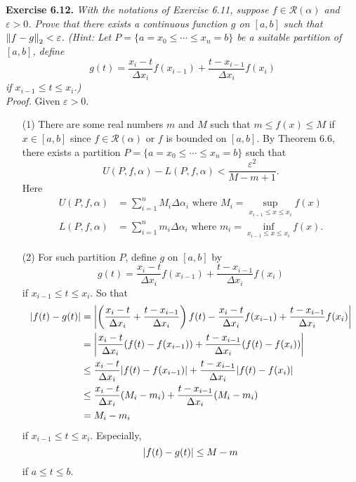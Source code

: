 \documentclass{article}
\begin{document}



\textbf{Exercise 6.12.}
\emph{With the notations of Exercise 6.11,
suppose $f \in \mathscr{R}(\alpha)$ and $\varepsilon > 0$.
Prove that there exists a continuous function $g$ on $[a,b]$
such that $\norm{f-g}_2 < \varepsilon$.
(Hint: Let $P = \{a=x_0 \leq \cdots \leq x_n = b\}$ be a suitable partition of $[a,b]$,
define
\[
  g(t) = \frac{x_i-t}{\Delta x_i} f(x_{i-1}) + \frac{t-x_{i-1}}{\Delta x_i} f(x_i)
\]
if $x_{i-1} \leq t \leq x_i$.)} \\

\emph{Proof.}
Given $\varepsilon > 0$.
\begin{enumerate}
\item[(1)]
There are some real numbers $m$ and $M$
such that $m \leq f(x) \leq M$ if $x \in [a,b]$ since $f \in \mathscr{R}(\alpha)$
or $f$ is bounded on $[a,b]$.
By Theorem 6.6, there exists a partition
$P = \{a=x_0 \leq \cdots \leq x_n = b\}$ such that
\[
  U(P,f,\alpha) - L(P,f,\alpha) < \frac{\varepsilon^2}{M - m + 1}.
\]
Here
\begin{align*}
  U(P,f,\alpha) &= \sum_{i=1}^n M_i \Delta \alpha_i
    \text{ where } M_i = \sup_{x_{i-1} \leq x \leq x_i} f(x) \\
  L(P,f,\alpha) &= \sum_{i=1}^n m_i \Delta \alpha_i
    \text{ where } m_i = \inf_{x_{i-1} \leq x \leq x_i} f(x).
\end{align*}

\item[(2)]
For such partition $P$, define $g$ on $[a,b]$ by
\[
  g(t) = \frac{x_i-t}{\Delta x_i} f(x_{i-1}) + \frac{t-x_{i-1}}{\Delta x_i} f(x_i)
\]
if $x_{i-1} \leq t \leq x_i$.
So that
\begin{align*}
  \abs{ f(t) - g(t) }
  &= \abs{ \left( \frac{x_i-t}{\Delta x_i} + \frac{t-x_{i-1}}{\Delta x_i} \right) f(t)
    - \frac{x_i-t}{\Delta x_i} f(x_{i-1}) + \frac{t-x_{i-1}}{\Delta x_i} f(x_i) } \\
  &= \abs{ \frac{x_i-t}{\Delta x_i}(f(t) - f(x_{i-1}))
    +  \frac{t-x_{i-1}}{\Delta x_i}(f(t) - f(x_i)) } \\
  &\leq \frac{x_i-t}{\Delta x_i}\abs{ f(t) - f(x_{i-1}) }
    +  \frac{t-x_{i-1}}{\Delta x_i}\abs{ f(t) - f(x_i) } \\
  &\leq \frac{x_i-t}{\Delta x_i} (M_i - m_i) + \frac{t-x_{i-1}}{\Delta x_i}(M_i - m_i) \\
  &= M_i - m_i
\end{align*}
if $x_{i-1} \leq t \leq x_i$.
Especially,
\[
  \abs{ f(t) - g(t) } \leq M - m
\]
if $a \leq t \leq b$.


\end{enumerate}
\end{document}
